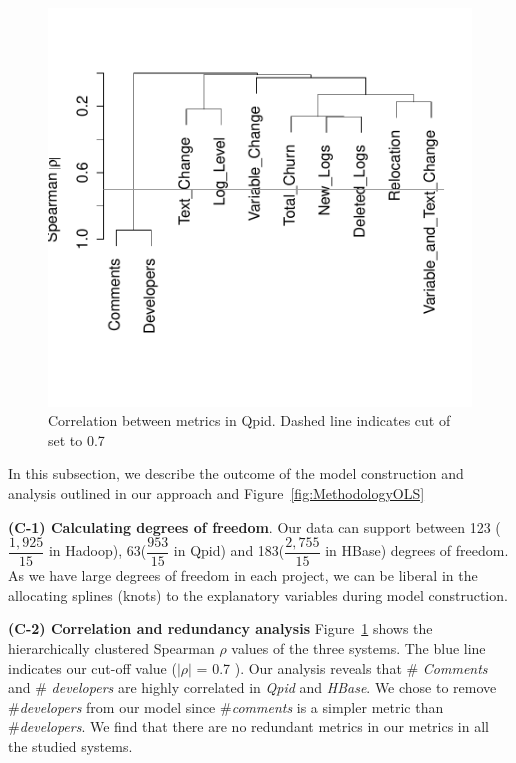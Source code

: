 \begin{figure}[t]
	\centering 
	\begin{minipage}[b]{0.8\columnwidth}
		
		\includegraphics[width=.81\columnwidth]{QpidSpearman}	
	\end{minipage}
	
	\caption{Correlation between metrics in Qpid. Dashed line indicates cut of set to 0.7\label{fig:Correlation}}
\end{figure}

In this subsection, we describe the outcome of the model construction and analysis outlined in our approach and Figure~\ref{fig:MethodologyOLS}

\textbf{(C-1) Calculating degrees of freedom}. Our data can support between 123 ($\dfrac{1,925}{15}$ in Hadoop), 63($\dfrac{953}{15}$ in Qpid) and 183($\dfrac{2,755}{15} $ in HBase) degrees of freedom. As we have large degrees of freedom in each project, we can be liberal in the allocating splines (knots) to the explanatory variables during model construction. 


\textbf{{(C-2) Correlation and redundancy analysis}} Figure~\ref{fig:Correlation} shows the hierarchically clustered Spearman $\rho$ values of the three systems. The blue line indicates our cut-off value ($|\rho|$ = 0.7 ). Our analysis reveals that \# \textsl{Comments} and \# \textsl{developers} are highly correlated in \emph{Qpid} and \emph{HBase}. We chose to remove \#\textsl{developers} from our model since \#\textsl{comments} is a simpler metric than \#\textsl{developers}. We find that there are no redundant metrics in our metrics in all the studied systems.


